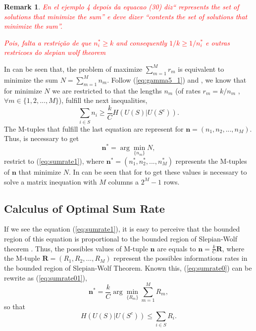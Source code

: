 \documentclass[journal]{IEEEtran}
\newtheorem{remark}[theorem]{Remark}
\begin{document}
\begin{remark}
\textcolor{red}{En el ejemplo 4 depois da equacao (30) diz`` represents the set of solutions that minimize the sum''
e deve dizer ``contents the set of solutions that minimize the sum''.}

\textcolor{red}{
Pois, falta a restrição de que $n^*_i\geq k$ and consequently $1/k\geq 1/n^*_i$
e outras restricoes do slepian wolf theorem}
\end{remark}

In \cite{fernando} can be seen that, the problem of maximize $\sum_{m=1}^{M}{ r_m}$ 
is equivalent to minimize the sum $N=\sum_{m=1}^{M}{ n_m}$. 
Follow  (\ref{eq:gamma5_1}) and \cite{fernando}, we know that for minimize $N$ 
we are restricted to  that the 
lengths $n_m$ (of rates $r_m=k/n_m$ , $\forall m \in \{1, 2, ..., M\}$), fulfill the next inequalities,
\begin{equation}\label{eq:sumrate1}
  \sum_{i \in S}{n_i}\geq \frac{k}{C} H(U(S)|U(S^c)).
\end{equation}
The M-tuples that fulfill the last equation are represent for $\mathbf{n}=(n_1,n_2, ..., n_M)$.
Thus, is necessary
to get
\begin{equation}\label{eq:sumrate0}
\mathbf{n^*}=\arg{ \min \limits_{\{n_m\}}{N} },
\end{equation}
restrict to (\ref{eq:sumrate1}),
where $\mathbf{n^*}=(n^*_1, n^*_2, ..., n^*_M)$ represents the M-tuples of 
$\mathbf{n}$ that minimize $N$. 
In \cite{fernando} can be seen that for to get these values 
is necessary to solve a matrix inequation with $M$ columns a $2^{M}-1$ rows.
\subsection{Calculus of Optimal Sum Rate } \label{subsec:sumratemethod}
If we see the equation (\ref{eq:sumrate1}), it is easy to perceive that the bounded
region of this equation is proportional to the bounded region of Slepian-Wolf
theorem  \cite{slepian,cover}. Thus, the possibles values of M-tuple 
$\mathbf{n}$ are equals to $\mathbf{n} = \frac{k}{C} \mathbf{R}$,
where the M-tuple $\mathbf{R}=(R_1,R_2, ..., R_M)$ represent the possibles informations rates
in the bounded region of Slepian-Wolf Theorem. Known
this, (\ref{eq:sumrate0}) can be rewrite as (\ref{eq:sumrate01}),
\begin{equation}\label{eq:sumrate01}
\mathbf{n^*}= \frac{k}{C} \arg{\min \limits_{\{R_m\}}{\sum_{m=1}^{M}{ R_m} }},
\end{equation}
so that 
\begin{equation}\label{eq:sumrate01a}
H(U(S)|U(S^c)) \leq \sum_{i\in S}{ R_i}.
\end{equation}
\end{document}
